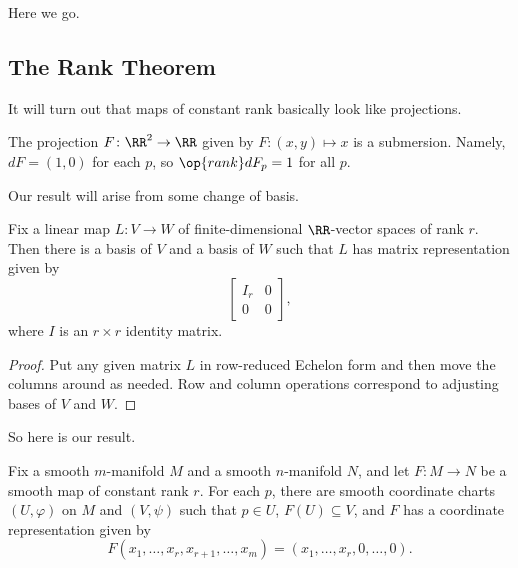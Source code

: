 \documentclass[../notes.tex]{subfiles}
\begin{document}
Here we go.

\subsection{The Rank Theorem}
It will turn out that maps of constant rank basically look like projections.
\begin{example}
	The projection $F\colon\RR^2\to\RR$ given by $F\colon(x,y)\mapsto x$ is a submersion. Namely, $dF=(1,0)$ for each $p$, so $\op{rank}dF_p=1$ for all $p$.
\end{example}
Our result will arise from some change of basis.
\begin{proposition} \label{prop:change-basis-to-rank}
	Fix a linear map $L\colon V\to W$ of finite-dimensional $\RR$-vector spaces of rank $r$. Then there is a basis of $V$ and a basis of $W$ such that $L$ has matrix representation given by
	\[\begin{bmatrix}
		I_r & 0 \\ 0 & 0
	\end{bmatrix},\]
	where $I$ is an $r\times r$ identity matrix.
\end{proposition}
\begin{proof}
	Put any given matrix $L$ in row-reduced Echelon form and then move the columns around as needed. Row and column operations correspond to adjusting bases of $V$ and $W$.
\end{proof}
So here is our result.
\begin{theorem} \label{thm:rank}
	Fix a smooth $m$-manifold $M$ and a smooth $n$-manifold $N$, and let $F\colon M\to N$ be a smooth map of constant rank $r$. For each $p$, there are smooth coordinate charts $(U,\varphi)$ on $M$ and $(V,\psi)$ such that $p\in U$, $F(U)\subseteq V$, and $F$ has a coordinate representation given by
	\[F(x_1,\ldots,x_r,x_{r+1},\ldots,x_m)=(x_1,\ldots,x_r,0,\ldots,0).\]
\end{theorem}
\end{document}

